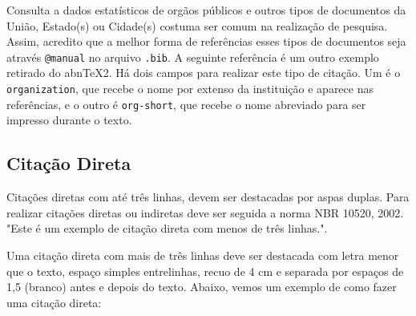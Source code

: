 \documentclass[
  12pt,		%
  a4paper,	%
  openright,%
  oneside,	%
  chapter=TITLE,		%
  section=TITLE,		%
  english,	%
  french,	%
  spanish,	%
  brazil
]{abntex2}
\begin{document}
            Consulta a dados estatísticos de orgãos públicos e outros tipos de documentos da União, Estado(s) ou Cidade(s) costuma ser comum na realização de pesquisa. Assim, acredito que a melhor forma de referências esses tipos de documentos seja através \verb|@manual| no arquivo \verb|.bib|. A seguinte referência \cite{brasil} é um outro exemplo retirado do abn\TeX2. Há dois campos para realizar este tipo de citação. Um é o \verb|organization|, que recebe o nome por extenso da instituição e aparece nas referências, e o outro é \verb|org-short|, que recebe o nome abreviado para ser impresso durante o texto.
        
        \subsection{Citação Direta}
        
            Citações diretas com até três linhas, devem ser destacadas por aspas duplas. Para realizar citações diretas ou indiretas deve ser seguida a norma NBR 10520, 2002. "Este é um exemplo de citação direta com menos de três linhas."\cite{artigo}.
    
             Uma citação direta com mais de três linhas deve ser destacada com letra menor que o texto, espaço simples entrelinhas, recuo de 4 cm e separada por espaços de 1,5 (branco) antes e depois do texto. Abaixo, vemos um exemplo de como fazer uma citação direta:
            
            
            
\end{document}
